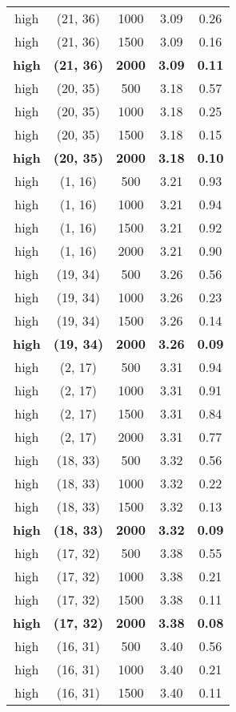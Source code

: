 \begin{tabular}{c c c c c}
high & (21, 36) &  1000 & 3.09 & 0.26 \\
high & (21, 36) &  1500 & 3.09 & 0.16 \\
\textbf{high} & \textbf{(21, 36)} & \textbf{ 2000} & \textbf{3.09} & \textbf{0.11} \\
high & (20, 35) &  500 & 3.18 & 0.57 \\
high & (20, 35) &  1000 & 3.18 & 0.25 \\
high & (20, 35) &  1500 & 3.18 & 0.15 \\
\textbf{high} & \textbf{(20, 35)} & \textbf{ 2000} & \textbf{3.18} & \textbf{0.10} \\
high & (1, 16) &  500 & 3.21 & 0.93 \\
high & (1, 16) &  1000 & 3.21 & 0.94 \\
high & (1, 16) &  1500 & 3.21 & 0.92 \\
high & (1, 16) &  2000 & 3.21 & 0.90 \\
high & (19, 34) &  500 & 3.26 & 0.56 \\
high & (19, 34) &  1000 & 3.26 & 0.23 \\
high & (19, 34) &  1500 & 3.26 & 0.14 \\
\textbf{high} & \textbf{(19, 34)} & \textbf{ 2000} & \textbf{3.26} & \textbf{0.09} \\
high & (2, 17) &  500 & 3.31 & 0.94 \\
high & (2, 17) &  1000 & 3.31 & 0.91 \\
high & (2, 17) &  1500 & 3.31 & 0.84 \\
high & (2, 17) &  2000 & 3.31 & 0.77 \\
high & (18, 33) &  500 & 3.32 & 0.56 \\
high & (18, 33) &  1000 & 3.32 & 0.22 \\
high & (18, 33) &  1500 & 3.32 & 0.13 \\
\textbf{high} & \textbf{(18, 33)} & \textbf{ 2000} & \textbf{3.32} & \textbf{0.09} \\
high & (17, 32) &  500 & 3.38 & 0.55 \\
high & (17, 32) &  1000 & 3.38 & 0.21 \\
high & (17, 32) &  1500 & 3.38 & 0.11 \\
\textbf{high} & \textbf{(17, 32)} & \textbf{ 2000} & \textbf{3.38} & \textbf{0.08} \\
high & (16, 31) &  500 & 3.40 & 0.56 \\
high & (16, 31) &  1000 & 3.40 & 0.21 \\
high & (16, 31) &  1500 & 3.40 & 0.11 \\

\end{tabular}
